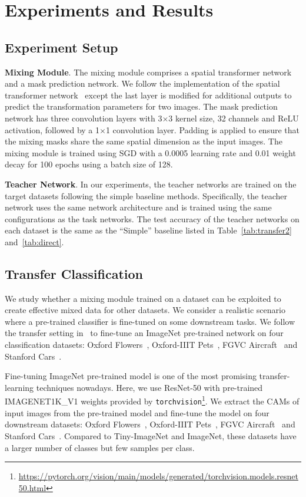 \documentclass[10pt]{article} %
\begin{document}
\section{Experiments and Results}
\subsection{Experiment Setup}
\noindent \textbf{Mixing Module}. The mixing module comprises a spatial transformer network and a mask prediction network. We follow the implementation of the spatial transformer network~\citep{stn} except the last layer is modified for additional outputs to predict the transformation parameters for two images. The mask prediction network has three convolution layers with 3$\times$3 kernel size, 32 channels and ReLU activation, followed by a 1$\times$1 convolution layer. Padding is applied to ensure that the mixing masks share the same spatial dimension as the input images. The mixing module is trained using SGD with a 0.0005 learning rate and 0.01 weight decay for 100 epochs using a batch size of 128.

\noindent \textbf{Teacher Network}. In our experiments, the teacher networks are trained on the target datasets following the simple baseline methods. Specifically, the teacher network uses the same network architecture and is trained using the same configurations as the task networks. The test accuracy of the teacher networks on each dataset is the same as the ``Simple'' baseline listed in Table~\ref{tab:transfer2} and~\ref{tab:direct}. 

\subsection{Transfer Classification}
\noindent We study whether a mixing module trained on a dataset can be exploited to create effective mixed data for other datasets. We consider a realistic scenario where a pre-trained classifier is fine-tuned on some downstream tasks. We follow the transfer setting in~\citep{adaaug} to fine-tune an ImageNet pre-trained network on four classification datasets: Oxford Flowers~\citep{flower}, Oxford-IIIT Pets~\citep{pet}, FGVC Aircraft~\citep{aircraft} and Stanford Cars~\citep{car}.

Fine-tuning ImageNet pre-trained model is one of the most promising transfer-learning techniques nowadays. Here, we use ResNet-50 with pre-trained IMAGENET1K\_V1 weights provided by \texttt{torchvision}\footnote{\url{https://pytorch.org/vision/main/models/generated/torchvision.models.resnet50.html}}. We extract the CAMs of input images from the pre-trained model and fine-tune the model on four downstream datasets: Oxford Flowers~\citep{flower}, Oxford-IIIT Pets~\citep{pet}, FGVC Aircraft~\citep{aircraft} and Stanford Cars~\citep{car}. Compared to Tiny-ImageNet and ImageNet, these datasets have a larger number of classes but few samples per class.
\end{document}
